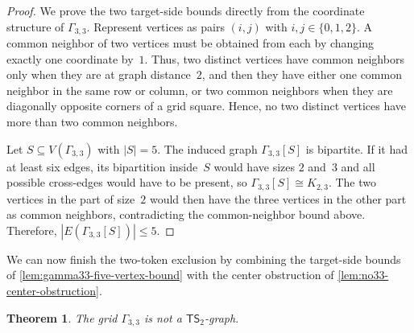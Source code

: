 \documentclass[a4paper]{article}
\theoremstyle{plain}
\newtheorem{theorem}{Theorem}[section]
\theoremstyle{definition}
\newcommand{\TSsym}{\mathsf{TS}}
\numberwithin{equation}{section}
\begin{document}
\begin{proof}
We prove the two target-side bounds directly from the coordinate structure of $\Gamma_{3,3}$.
Represent vertices as pairs $(i,j)$ with $i,j\in\{0,1,2\}$.
A common neighbor of two vertices must be obtained from each by changing exactly one coordinate by~$1$.
Thus, two distinct vertices have common neighbors only when they are at graph distance~$2$, and then they have either one common neighbor in the same row or column, or two common neighbors when they are diagonally opposite corners of a grid square.
Hence, no two distinct vertices have more than two common neighbors.

Let $S\subseteq V(\Gamma_{3,3})$ with $|S|=5$.
The induced graph $\Gamma_{3,3}[S]$ is bipartite.
If it had at least six edges, its bipartition inside~$S$ would have sizes $2$ and~$3$ and all possible cross-edges would have to be present, so $\Gamma_{3,3}[S]\cong K_{2,3}$.
The two vertices in the part of size~$2$ would then have the three vertices in the other part as common neighbors, contradicting the common-neighbor bound above.
Therefore, $|E(\Gamma_{3,3}[S])|\le 5$.
\end{proof}

We can now finish the two-token exclusion by combining the target-side bounds of \cref{lem:gamma33-five-vertex-bound} with the center obstruction of \cref{lem:no33-center-obstruction}.

\begin{theorem}
\label{thm:no33}
The grid $\Gamma_{3,3}$ is not a $\TSsym_2$-graph.
\end{theorem}
\end{document}
